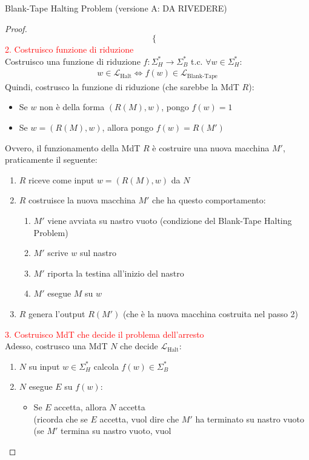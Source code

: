 \documentclass{article}  %
\theoremstyle{definition}
\begin{document}
\begin{theorem}{Blank-Tape Halting Problem (versione A: DA RIVEDERE)}
\begin{proof}
\[\begin{cases}
    \end{cases}
    \]
    \textcolor{red}{2. Costruisco funzione di riduzione} \\
    Costruisco una funzione di riduzione $f: \Sigma_H^* \rightarrow \Sigma_B^*$ t.c. $\forall{w} \in \Sigma_H^*$:
    \begin{align*}
      w \in \mathcal{L}_{\text{Halt}} \iff f(w) \in \mathcal{L}_{\text{Blank-Tape}}
    \end{align*}
    Quindi, costrusco la funzione di riduzione (che sarebbe la MdT $R$):
    \begin{itemize}
      \item Se $w$ non è della forma $(R(M),w)$, pongo $f(w)=1$
      \item Se $w=(R(M),w)$, allora pongo $f(w)=R(M')$
    \end{itemize}
    Ovvero, il funzionamento della MdT $R$ è costruire una nuova macchina $M'$, praticamente il seguente:
    \begin{enumerate}
      \item $R$ riceve come input $w=(R(M),w)$ da $N$
      \item $R$ costruisce la nuova macchina $M'$ che ha questo comportamento:
      \begin{enumerate}
        \item $M'$ viene avviata su nastro vuoto (condizione del Blank-Tape Halting Problem)
        \item $M'$ scrive $w$ sul nastro
        \item $M'$ riporta la testina all'inizio del nastro
        \item $M'$ esegue $M$ su $w$
      \end{enumerate}
      \item $R$ genera l'output $R(M')$ (che è la nuova macchina costruita nel passo 2)
    \end{enumerate}
    \textcolor{red}{3. Costruisco MdT che decide il problema dell'arresto} \\
    Adesso, costrusco una MdT $N$ che decide $\mathcal{L}_{\text{Halt}}$:
    \begin{enumerate}
      \item $N$ su input $w \in \Sigma_H^*$ calcola $f(w) \in \Sigma_B^*$
      \item $N$ esegue $E$ su $f(w)$:
      \begin{itemize}
        \item Se $E$ accetta, allora $N$ accetta \\
        (ricorda che se $E$ accetta, vuol dire che $M'$ ha terminato su nastro vuoto (se $M'$ termina su nastro vuoto, vuol

\end{itemize}
\end{enumerate}
\end{proof}
\end{theorem}
\end{document}
